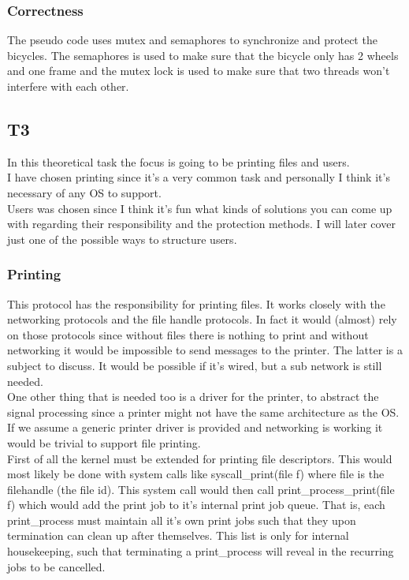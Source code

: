 \documentclass[12pt]{article}
\begin{document}
\vspace{2 mm}

\subsubsection{Correctness}

The pseudo code uses mutex and semaphores to synchronize and protect the bicycles. The semaphores is used to make sure that the bicycle only has 2 wheels and one frame and the mutex lock is used to make sure that two threads won't interfere with each other.


\subsection{T3}

In this theoretical task the focus is going to be printing files and users. \\

I have chosen printing since it's a very common task and personally I think it's necessary of any OS to support.\\

Users was chosen since I think it's fun what kinds of solutions you can come up with regarding their responsibility and the protection methods. I will later cover just one of the possible ways to structure users.  

\subsubsection{Printing}

This protocol has the responsibility for printing files. It works closely with the networking protocols and the file handle protocols. In fact it would (almost) rely on those protocols since without files there is nothing to print and without networking it would be impossible to send messages to the printer. The latter is a subject to discuss. It would be possible if it's wired, but a sub network is still needed.\\

One other thing that is needed too is a driver for the printer, to abstract the signal processing since a printer might not have the same architecture as the OS. If we assume a generic printer driver is provided and networking is working it would be trivial to support file printing.\\

First of all the kernel must be extended for printing file descriptors. This would most likely be done with system calls like syscall\_print(file f) where file is the filehandle (the file id). This system call would then call print\_process\_print(file f) which would add the print job to it's internal print job queue. That is, each print\_process must maintain all it's own print jobs such that they upon termination can clean up after themselves. This list is only for internal housekeeping, such that terminating a print\_process will reveal in the recurring jobs to be cancelled.\\
\end{document}
